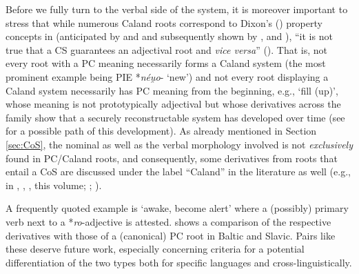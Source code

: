 \documentclass[output=paper,colorlinks,citecolor=brown]{langscibook}
\begin{document}
Before we fully turn to the verbal side of the system, it is moreover important to stress that while numerous Caland roots correspond to Dixon's (\citeyear{Dixon1982}) property concepts in  (anticipated by \citealt{Watkins1971} and \citealt{Nussbaum1976} and subsequently shown by \citealt{Balles2006}, \citeyear{Balles2009} and \citealt{Rau2009}), ``it is not true that a CS   guarantees an adjectival root and \textit{vice versa}'' (\citealt[207]{Nussbaum2022}). That is, not every root with a PC meaning necessarily forms a Caland system  (the most prominent example being PIE *\textit{néu̯o}- `new') and not every root displaying a Caland system   necessarily has PC meaning from the beginning, e.g.,  `fill (up)', whose meaning is not prototypically adjectival  but whose derivatives across the family show that a securely reconstructable system has developed over time (see \citealt[208, fn.\ 7]{Nussbaum2022} for a possible path of this development). As already mentioned in Section \ref{sec:CoS}, the nominal as well as the verbal morphology involved is not \emph{exclusively} found in PC/Caland roots,  and consequently, some derivatives from roots that entail a CoS  are discussed under the label ``Caland'' in the literature as well (e.g., in \citealt{Rau2009}, \citealt{Rau2009}, \citealt{Rau2013}, this volume; \citealt{Bozzone2016}; \citealt{Majer2017}). 

A frequently quoted example is  `awake, become alert' where a (possibly) primary   verb next to a *\textit{ro}-adjective  is attested.  shows a comparison of the respective derivatives with those of a (canonical) PC root in Baltic and Slavic. Pairs like these deserve future work, especially concerning criteria for a potential differentiation of the two types both for specific languages and cross-linguistically.
\end{document}

